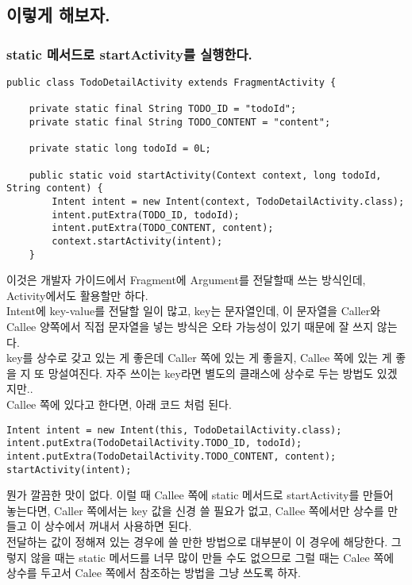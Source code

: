 \subsection{이렇게 해보자.}

\subsubsection{static 메서드로 startActivity를 실행한다.}
\begin{lstlisting}[frame=single]
public class TodoDetailActivity extends FragmentActivity {
	
	private static final String TODO_ID = "todoId";
	private static final String TODO_CONTENT = "content";
	
	private static long todoId = 0L;

	public static void startActivity(Context context, long todoId, String content) {
		Intent intent = new Intent(context, TodoDetailActivity.class);
		intent.putExtra(TODO_ID, todoId);
		intent.putExtra(TODO_CONTENT, content);
		context.startActivity(intent);
	}
\end{lstlisting}
이것은 개발자 가이드에서 Fragment에 Argument를 전달할때 쓰는 방식인데, Activity에서도 활용할만 하다.\\
Intent에 key-value를 전달할 일이 많고, key는 문자열인데, 이 문자열을 Caller와 Callee 양쪽에서 직접 문자열을 넣는 방식은 오타 가능성이 있기 때문에 잘 쓰지 않는다.\\
key를 상수로 갖고 있는 게 좋은데 Caller 쪽에 있는 게 좋을지, Callee 쪽에 있는 게 좋을 지 또 망설여진다. 자주 쓰이는 key라면 별도의 클래스에 상수로 두는 방법도 있겠지만..\\

Callee 쪽에 있다고 한다면, 아래 코드 처럼 된다. 
\begin{lstlisting}[frame=single]
Intent intent = new Intent(this, TodoDetailActivity.class);
intent.putExtra(TodoDetailActivity.TODO_ID, todoId);
intent.putExtra(TodoDetailActivity.TODO_CONTENT, content);
startActivity(intent);
\end{lstlisting}
뭔가 깔끔한 맛이 없다. 이럴 때 Callee 쪽에 static 메서드로 startActivity를 만들어 놓는다면, Caller 쪽에서는 key 값을 신경 쓸 필요가 없고, Callee 쪽에서만 상수를 만들고 이 상수에서 꺼내서 사용하면 된다.\\
전달하는 값이 정해져 있는 경우에 쓸 만한 방법으로 대부분이 이 경우에 해당한다.
그렇지 않을 때는 static  메서드를 너무 많이 만들 수도 없으므로 그럴 때는 Calee 쪽에 상수를 두고서 Calee 쪽에서 참조하는 방법을 그냥 쓰도록 하자.\\

